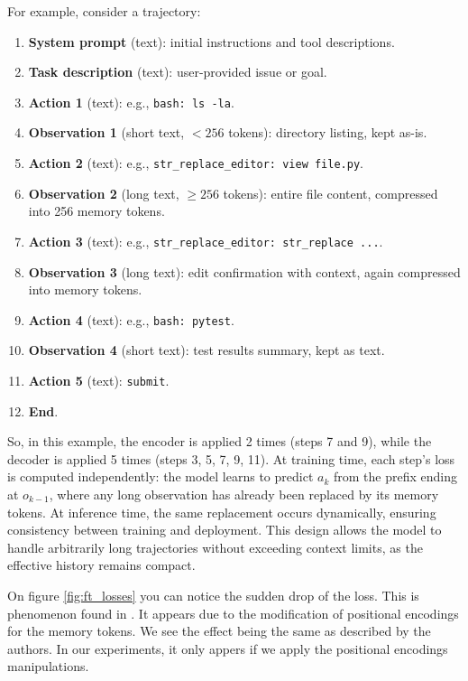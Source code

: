 For example, consider a trajectory:
\begin{enumerate}
  \item \textbf{System prompt} (text): initial instructions and tool descriptions.
  \item \textbf{Task description} (text): user-provided issue or goal.
  \item \textbf{Action 1} (text): e.g., \texttt{bash: ls -la}.
  \item \textbf{Observation 1} (short text, $<256$ tokens): directory listing, kept as-is.
  \item \textbf{Action 2} (text): e.g., \texttt{str\_replace\_editor: view file.py}.
  \item \textbf{Observation 2} (long text, $\geq 256$ tokens): entire file content, compressed into 256 memory tokens.
  \item \textbf{Action 3} (text): e.g., \texttt{str\_replace\_editor: str\_replace ...}.
  \item \textbf{Observation 3} (long text): edit confirmation with context, again compressed into memory tokens.
  \item \textbf{Action 4} (text): e.g., \texttt{bash: pytest}.
  \item \textbf{Observation 4} (short text): test results summary, kept as text.
  \item \textbf{Action 5} (text): \texttt{submit}.
  \item \textbf{End}.
\end{enumerate}
So, in this example, the encoder is applied 2 times (steps 7 and 9), while the decoder is applied 5 times (steps 3, 5, 7, 9, 11).
At training time, each step's loss is computed independently: the model learns to predict \(a_k\) from the prefix ending at \(o_{k-1}\), where any long observation has already been replaced by its memory tokens.
At inference time, the same replacement occurs dynamically, ensuring consistency between training and deployment.
This design allows the model to handle arbitrarily long trajectories without exceeding context limits, as the effective history remains compact.

On figure \ref{fig:ft_losses} you can notice the sudden drop of the loss.
This is phenomenon found in \cite{PI}.
It appears due to the modification of positional encodings for the memory tokens.
We see the effect being the same as described by the authors.
In our experiments, it only appers if we apply the positional encodings manipulations.

